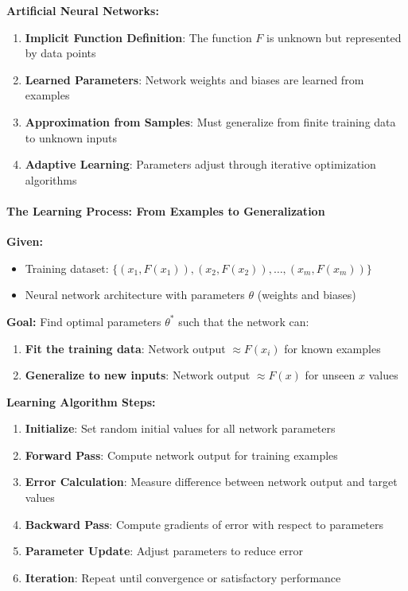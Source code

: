 \textbf{Artificial Neural Networks:}

\begin{enumerate}
\item \textbf{Implicit Function Definition}: The function $F$ is unknown but represented by data points
\item \textbf{Learned Parameters}: Network weights and biases are learned from examples
\item \textbf{Approximation from Samples}: Must generalize from finite training data to unknown inputs
\item \textbf{Adaptive Learning}: Parameters adjust through iterative optimization algorithms
\end{enumerate}

\paragraph{The Learning Process: From Examples to Generalization}
\label{para:learning-process-generalization}

\textbf{Given:}

\begin{itemize}
\item Training dataset: $\{(x_1, F(x_1)), (x_2, F(x_2)), \ldots, (x_m, F(x_m))\}$
\item Neural network architecture with parameters $\theta$ (weights and biases)
\end{itemize}

\textbf{Goal:}
Find optimal parameters $\theta^*$ such that the network can:

\begin{enumerate}
\item \textbf{Fit the training data}: Network output $\approx F(x_i)$ for known examples
\item \textbf{Generalize to new inputs}: Network output $\approx F(x)$ for unseen $x$ values
\end{enumerate}

\textbf{Learning Algorithm Steps:}

\begin{enumerate}
\item \textbf{Initialize}: Set random initial values for all network parameters
\item \textbf{Forward Pass}: Compute network output for training examples
\item \textbf{Error Calculation}: Measure difference between network output and target values
\item \textbf{Backward Pass}: Compute gradients of error with respect to parameters
\item \textbf{Parameter Update}: Adjust parameters to reduce error
\item \textbf{Iteration}: Repeat until convergence or satisfactory performance
\end{enumerate}

